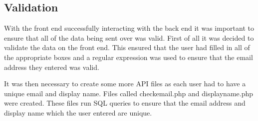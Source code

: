 \subsection{Validation}
With the front end successfully interacting with the back end it was important to ensure that all of the data being sent over was valid. First of all it was decided to validate the data on the front end. This ensured that the user had filled in all of the appropriate boxes and a regular expression was used to ensure that the email address they entered was valid.

It was then necessary to create some more API files as each user had to have a unique email and display name. Files called checkemail.php and displayname.php were created. These files run SQL queries to ensure that the email address and display name which the user entered are unique.

